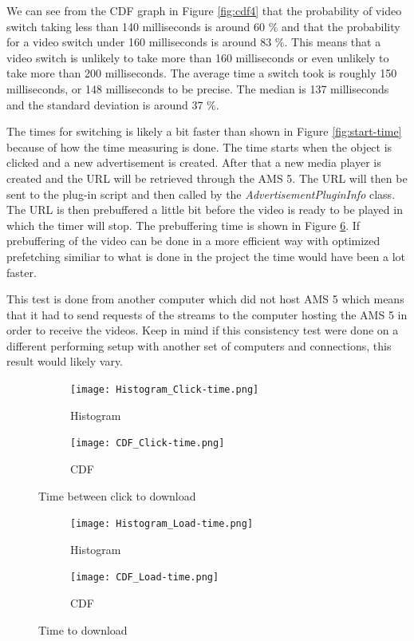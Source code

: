We can see from the CDF graph in Figure \ref{fig:cdf4} that the probability of video switch taking less than 140 milliseconds is around 60 $\%$ and that the probability for a video switch under 160 milliseconds is around 83 $\%$. This means that a video switch is unlikely to take more than 160 milliseconds or even unlikely to take more than 200 milliseconds.  The average time a switch took is roughly 150 milliseconds, or 148 milliseconds to be precise. The median is 137 milliseconds and the standard deviation is around 37 $\%$.

The times for switching is likely a bit faster than shown in Figure \ref{fig:start-time} because of how the time measuring is done. The time starts when the object is clicked and a new advertisement is created. After that a new media player is created and  the URL will be retrieved through the AMS 5. The URL will then be sent to the plug-in script and then called by the \textit{AdvertisementPluginInfo} class. The URL is then prebuffered a little bit before the video is ready to be played in which the timer will stop. The prebuffering time is shown in Figure \ref{fig:load-time}. If prebuffering of the video can be done in a more efficient way with optimized prefetching similiar to what is done in the project \cite{optimizedstreaming} the time would have been a lot faster. 

This test is done from another computer which did not host AMS 5 which means that it had to send requests of the streams to the computer hosting the AMS 5 in order to receive the videos. Keep in mind if this consistency test were done on a different performing setup with another set of computers and connections, this result would likely vary.

\hspace*{-2cm}
\begin{figure}[!ht]
\begin{subfigure}[b]{0.5\textwidth}
 	\texttt{[image: Histogram\_Click-time.png]}
  	\caption{Histogram}\label{fig:histogram}
    \end{subfigure}\hfill 
    \hspace{3px}
    \begin{subfigure}[b]{0.5\textwidth}
	 \texttt{[image: CDF\_Click-time.png]}
 	\caption{CDF}\label{fig:cdf}
    \end{subfigure}
	\caption{Time between click to download}
	\label{fig:click-time}
\end{figure}

\begin{figure}
\begin{subfigure}[b]{0.5\textwidth}
 	\texttt{[image: Histogram\_Load-time.png]}
  	\caption{Histogram}\label{fig:histogram2}
    \end{subfigure}\hfill 
    \hspace{3px}
    \begin{subfigure}[b]{0.5\textwidth}
	 \texttt{[image: CDF\_Load-time.png]}
 	\caption{CDF}\label{fig:cdf2}
    \end{subfigure}
	\caption{Time to download}
	\label{fig:load-time}
\end{figure}

